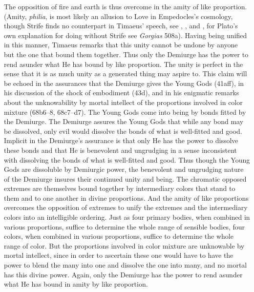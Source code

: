 The opposition of fire and earth is thus overcome in the amity of like proportion. (Amity, \emph{philia}, is most likely an allusion to Love in Empedocles's cosmology, though Strife finds no counterpart in Timaeus' speech, see \citealt[99--100]{Taylor:1928qb}, \citealt[44 n4]{Cornford:1935fk}, and \citealt[230 n119]{Broadie:2012vl}, for Plato's own explanation for doing without Strife see \emph{Gorgias} 508a). Having being unified in this manner, Timaeus remarks that this unity cannot be undone by anyone but the one that bound them together. Thus only the Demiurge has the power to rend asunder what He has bound by like proportion. The unity is perfect in the sense that it is as much unity as a generated thing may aspire to. This claim will be echoed in the assurances that the Demiurge gives the Young Gods (41aff), in his discussion of the shock of embodiment (43d), and in his enigmatic remarks about the unknowability by mortal intellect of the proportions involved in color mixture (68b6–8, 68c7–d7). The Young Gods come into being by bonds fitted by the Demiurge. The Demiurge assures the Young Gods that while any bond may be dissolved, only evil would dissolve the bonds of what is well-fitted and good. Implicit in the Demiurge's assurance is that only He has the power to dissolve these bonds and that He is benevolent and ungrudging in a sense inconsistent with dissolving the bonds of what is well-fitted and good. Thus though the Young Gods are dissoluble by Demiurgic power, the benevolent and ungrudging nature of the Demiurge insures their continued unity and being. The chromatic opposed extremes are themselves bound together by intermediary colors that stand to them and to one another in divine proportions. And the amity of like proportions overcomes the opposition of extremes to unify the extremes and the intermediary colors into an intelligible ordering. Just as four primary bodies, when combined in various proportions, suffice to determine the whole range of sensible bodies, four colors, when combined in various proportions, suffice to determine the whole range of color. But the proportions involved in color mixture are unknowable by mortal intellect, since in order to ascertain these one would have to have the power to blend the many into one and dissolve the one into many, and no mortal has this divine power. Again, only the Demiurge has the power to rend asunder what He has bound in amity by like proportion.

